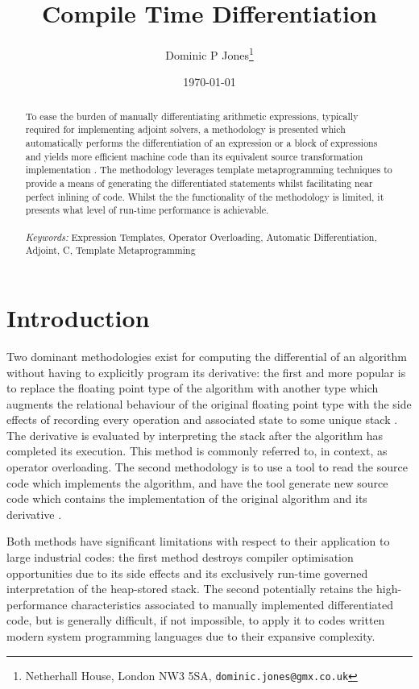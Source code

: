 \documentclass[a4paper,10pt]{article}
\title{Compile Time Differentiation}
\author{Dominic P Jones\footnote{Netherhall House, London NW3 5SA, \texttt{dominic.jones@gmx.co.uk}}}
\date{\today}
\def\CC{{C\nolinebreak[4]\hspace{-.05em}\raisebox{.4ex}{\tiny\bf ++}}}
\begin{document}
\maketitle


\begin{abstract}
To ease the burden of manually differentiating arithmetic expressions, typically required for implementing adjoint solvers, a methodology is presented which automatically performs the differentiation of an expression or a
block of expressions and yields more efficient machine code than its equivalent source transformation implementation \citep{TapenadeRef13}. The methodology leverages template metaprogramming techniques to provide a means of generating
the differentiated statements whilst facilitating near perfect inlining of code. Whilst the the functionality of the
methodology is limited, it presents what level of run-time performance is achievable.
\\\\{\noindent \emph{Keywords:} Expression Templates, Operator Overloading, Automatic Differentiation, Adjoint, {\CC}, Template Metaprogramming}
\end{abstract}


\section{Introduction}
Two dominant methodologies exist for computing the differential of an algorithm without having to explicitly
program its derivative: the first and more popular is to replace the floating point type of the algorithm with another
type which augments the relational behaviour of the original floating point type with the side effects of recording every
operation and associated state to some unique stack \citep{Griewank1999ACA}. The derivative is evaluated by interpreting the stack after
the algorithm has completed its execution. This method is commonly referred to, in context, as operator overloading.
The second methodology is to use a tool to read the source code which implements the algorithm, and have the tool
generate new source code which contains the implementation of the original algorithm and its derivative \citep{TapenadeRef13}.

Both methods have significant limitations with respect to their application to large industrial codes: the first method
destroys compiler optimisation opportunities due to its side effects and its exclusively run-time governed interpretation
of the heap-stored stack. The second potentially retains the high-performance characteristics associated to manually
implemented differentiated code, but is generally difficult, if not impossible, to apply it to codes written modern system
programming languages due to their expansive complexity.
\end{document}
